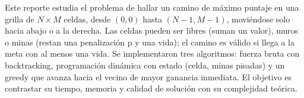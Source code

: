 Este reporte estudia el problema de hallar un camino 
de máximo puntaje en una grilla de $N \times M$ celdas, 
desde $(0,0)$ hasta $(N-1,M-1)$, moviéndose solo hacia 
abajo o a la derecha. Las celdas pueden ser libres 
(suman un valor), muros o minas 
(restan una penalización p y una vida); el camino es 
válido si llega a la meta con al menos una vida. 
Se implementaron tres algoritmos: fuerza bruta con 
backtracking, programación dinámica con estado 
(celda, minas pisadas) y un greedy que avanza hacia 
el vecino de mayor ganancia inmediata. El objetivo es 
contrastar su tiempo, memoria y calidad de solución con 
su complejidad teórica.